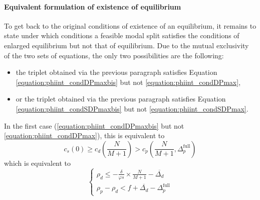 \documentclass[english, a4paper]{article}
\theoremstyle{plain}
\theoremstyle{definition}
\theoremstyle{remark}
\begin{document}
\paragraph{Equivalent formulation of existence of equilibrium}
To get back to the original conditions of existence of an equilibrium, it remains to state under which conditions a feasible modal split satisfies the conditions of enlarged equilibrium but not that of equilibrium. Due to the mutual exclusivity of the two sets of equations, the only two possibilities are the following:
\begin{itemize}
    \item the triplet obtained via the previous paragraph satisfies Equation \ref{equation:phiint_condDPmaxbis} but not \ref{equation:phiint_condDPmax},
    \item or the triplet obtained via the previous paragraph satisfies Equation \ref{equation:phiint_condSDPmaxbis} but not \ref{equation:phiint_condSDPmax}.
\end{itemize}

In the first case (\ref{equation:phiint_condDPmaxbis} but not \ref{equation:phiint_condDPmax}), this is equivalent to
\begin{equation*}
    c_s(0) \geq c_d \left(\frac{N}{M+1}\right) > c_p\left(\frac{N}{M+1}, \Delta _p^{\text{full}}\right)
\end{equation*}which is equivalent to
\begin{equation*}
    \left\{
    \begin{array}{l}
        \rho _d \leq - \frac{\delta}{\varphi s}\times \frac{N}{M+1} - \overline{\Delta _d}\\
        \rho _p - \rho _d < f + \overline{\Delta _d} - \Delta _p^{\text{full}}
    \end{array}
    \right.
\end{equation*}
\end{document}
